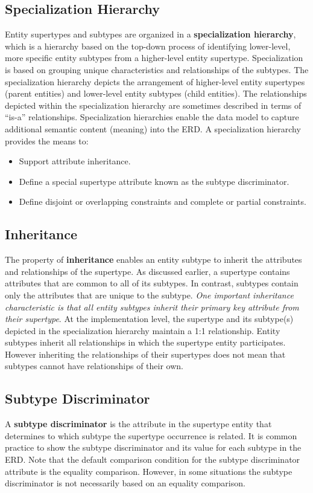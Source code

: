 \documentclass[a4paper, 12pt, titlepage]{report}
\begin{document}
{\subsection{Specialization Hierarchy}
Entity supertypes and subtypes are organized in a \textbf{specialization hierarchy}, which is a hierarchy based on the top-down process of identifying lower-level, more specific
entity subtypes from a higher-level entity supertype. Specialization is based on grouping unique characteristics and relationships of the subtypes. The specialization hierarchy depicts the arrangement of higher-level entity supertypes (parent entities) and lower-level entity subtypes (child entities). The relationships depicted within the specialization hierarchy are sometimes described in terms of “is-a” relationships. Specialization hierarchies enable the data model to capture additional semantic content (meaning) into the ERD.
A specialization hierarchy provides the means to:
\begin{itemize}
\item Support attribute inheritance.
\item Define a special supertype attribute known as the subtype discriminator.
\item Define disjoint or overlapping constraints and complete or partial constraints.
\end{itemize}
\subsection{Inheritance}
The property of \textbf{inheritance} enables an entity subtype to inherit the attributes and relationships of the supertype. As discussed earlier, a supertype contains attributes that are common to all of its subtypes. In contrast, subtypes contain only the attributes that are unique to the subtype. \emph{One important inheritance characteristic is that all entity subtypes inherit their primary key attribute from their supertype}. At the implementation level, the supertype and its subtype(s) depicted in the specialization hierarchy maintain a 1:1 relationship. Entity subtypes inherit all relationships in which the supertype entity participates. However inheriting the relationships of their supertypes does not mean that subtypes cannot have relationships of their own.
\subsection{Subtype Discriminator}
A \textbf{subtype discriminator} is the attribute in the supertype entity that determines to which subtype the supertype occurrence is related. It is common practice to show the subtype discriminator and its value for each subtype in the ERD. Note that the default comparison condition for the subtype discriminator attribute is the equality comparison. However, in some situations the subtype discriminator is not necessarily based on an equality comparison.
}
\end{document}
